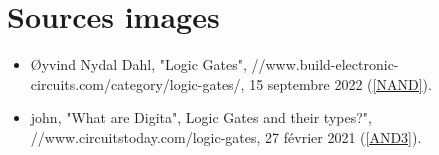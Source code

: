 \documentclass[a4paper, 11pt]{article}
\begin{document}
\section{Sources images}
\begin{itemize}
    \item Øyvind Nydal Dahl, "Logic Gates",  //www.build-electronic-circuits.com/category/logic-gates/, 15 septembre 2022 (\ref{NAND}).
    \item john, "What are Digita", Logic Gates and their types?", //www.circuitstoday.com/logic-gates, 27 février 2021 (\ref{AND3}).
\end{itemize}
\end{document}
